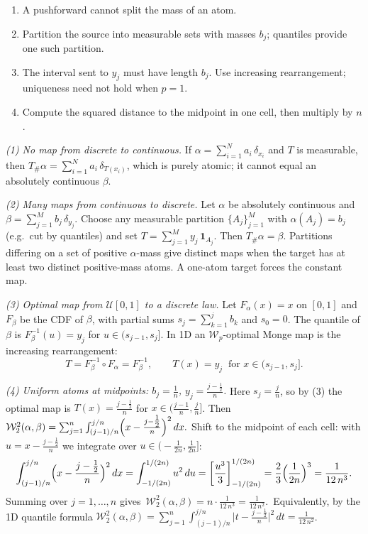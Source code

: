 \documentclass[11pt,a4paper]{article}
\theoremstyle{exostyle}
\newcommand{\push}{\#}
\newcommand{\W}{\mathcal{W}}
\newcommand{\Wtwo}{\mathcal{W}_2}
\newcommand{\Unif}{\mathcal U}
\begin{document}
\begin{hints}
\begin{enumerate}[label=(\arabic*)]
\item A pushforward cannot split the mass of an atom.
\item Partition the source into measurable sets with masses $b_j$; quantiles provide one such partition.
\item The interval sent to $y_j$ must have length $b_j$. Use increasing rearrangement; uniqueness need not hold when $p=1$.
\item Compute the squared distance to the midpoint in one cell, then multiply by $n$.
\end{enumerate}
\end{hints}
\begin{solution}
\emph{(1) No map from discrete to continuous.}
If $\alpha=\sum_{i=1}^N a_i\,\delta_{x_i}$ and $T$ is measurable, then
$T_{\push}\alpha=\sum_{i=1}^N a_i\,\delta_{T(x_i)}$, which is purely atomic; it cannot equal an absolutely continuous $\beta$.

\emph{(2) Many maps from continuous to discrete.}
Let $\alpha$ be absolutely continuous and $\beta=\sum_{j=1}^M b_j\,\delta_{y_j}$. Choose any measurable partition $\{A_j\}_{j=1}^M$ with $\alpha(A_j)=b_j$ (e.g.\ cut by quantiles) and set $T=\sum_{j=1}^M y_j\,\mathbf 1_{A_j}$. Then $T_{\push}\alpha=\beta$. Partitions differing on a set of positive $\alpha$-mass give distinct maps when the target has at least two distinct positive-mass atoms. A one-atom target forces the constant map.

\emph{(3) Optimal map from $\Unif[0,1]$ to a discrete law.}
Let $F_\alpha(x)=x$ on $[0,1]$ and $F_\beta$ be the CDF of $\beta$, with partial sums $s_j=\sum_{k=1}^j b_k$ and $s_0=0$. The quantile of $\beta$ is $F_\beta^{-1}(u)=y_j$ for $u\in(s_{j-1},s_j]$. In 1D an $\W_p$-optimal Monge map is the increasing rearrangement:
\[
T=F_\beta^{-1}\circ F_\alpha=F_\beta^{-1},\qquad
T(x)=y_j\ \text{ for }x\in(s_{j-1},s_j].
\]

\emph{(4) Uniform atoms at midpoints: $b_j=\frac1n$, $y_j=\frac{j-\tfrac12}{n}$.}
Here $s_j=\frac{j}{n}$, so by (3) the optimal map is $T(x)=\frac{j-\tfrac12}{n}$ for $x\in\big(\frac{j-1}{n},\frac{j}{n}\big]$. Then
$
\Wtwo^2(\alpha,\beta)=\sum_{j=1}^n \int_{(j-1)/n}^{j/n} \Bigl(x-\frac{j-\tfrac12}{n}\Bigr)^2\,dx.
$
Shift to the midpoint of each cell: with $u=x-\frac{j-\tfrac12}{n}$ we integrate over $u\in\big(-\frac{1}{2n},\frac{1}{2n}\big]$:
\[
\int_{(j-1)/n}^{j/n} \Bigl(x-\frac{j-\tfrac12}{n}\Bigr)^2\,dx
=\int_{-1/(2n)}^{1/(2n)} u^2\,du
=\left[\frac{u^3}{3}\right]_{-1/(2n)}^{1/(2n)}
=\frac{2}{3}\Bigl(\frac{1}{2n}\Bigr)^3=\frac{1}{12\,n^3}.
\]
Summing over $j=1,\dots,n$ gives
$
{\,\Wtwo^2(\alpha,\beta)=n\cdot \frac{1}{12\,n^3}=\frac{1}{12\,n^2}. \,}
$
Equivalently, by the 1D quantile formula $\Wtwo^2(\alpha,\beta)=\sum_{j=1}^n \int_{(j-1)/n}^{j/n} \bigl|t-\frac{j-\tfrac12}{n}\bigr|^2\,dt=\frac{1}{12\,n^2}$.
\end{solution}
\end{document}
